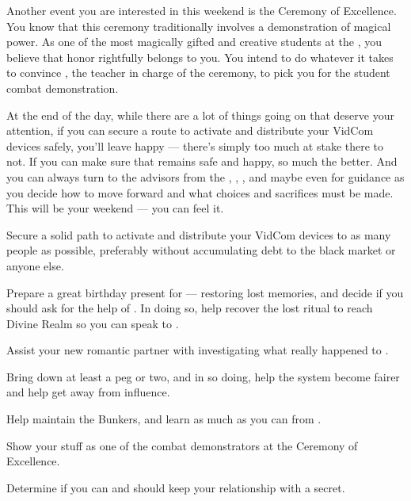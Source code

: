 \documentclass[char]{GL2020}
\begin{document}
Another event you are interested in this weekend is the Ceremony of Excellence. You know that this ceremony traditionally involves a demonstration of magical power. As one of the most magically gifted and creative students at the \pSc{}, you believe that honor rightfully belongs to you. You intend to do whatever it takes to convince \cMusic{}, the teacher in charge of the ceremony, to pick you for the student combat demonstration.

At the end of the day, while there are a lot of things going on that deserve your attention, if you can secure a route to activate and distribute your VidCom devices safely, you'll leave happy — there's simply too much at stake there to not. If you can make sure that \cDisney{} remains safe and happy, so much the better. And you can always turn to the advisors from the \pTech{}, \cAssistantScientist{}, \cHeadScientist{\full}, and maybe even \cDiplomat{} for guidance as you decide how to move forward and what choices and sacrifices must be made. This will be your weekend — you can feel it.

\begin{itemz}
    \item Secure a solid path to activate and distribute your VidCom devices to as many people as possible, preferably without accumulating debt to the black market or anyone else.
    \item Prepare a great birthday present for \cDisney{} — restoring \cDisney{\their} lost memories, and decide if you should ask for the help of \cWildCard{}. In doing so, help \cDisney{} recover the lost ritual to reach Divine Realm so you can speak to \cTechGod{}.
    \item Assist your new romantic partner \cWarlordDaughter{} with investigating what really happened to \cLoud{}.
    \item Bring down \cAntiChup{} at least a peg or two, and in so doing, help the system become fairer and help \cScholarship{} get away from \cAntiChup{\their} influence.  
    \item Help \cBunker{} maintain the Bunkers, and learn as much as you can from \cBunker{\them}.
    \item Show your stuff as one of the combat demonstrators at the Ceremony of Excellence.
    \item Determine if you can and should keep your relationship with \cWarlordDaughter{} a secret.
\end{itemz}
\end{document}
